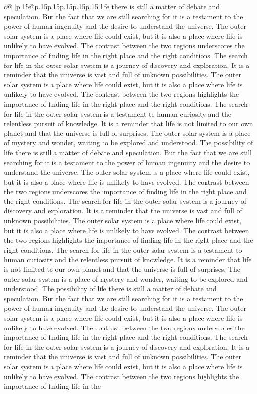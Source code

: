 \documentclass{article}
\begin{document}
{\begin{supertabular}{c@{$\;$}|p{.15\linewidth}@{}p{.15\linewidth}p{.15\linewidth}p{.15\linewidth}p{.15\linewidth}p{.15\linewidth}}
{{{life there is still a matter of debate and speculation. But the fact that we are still searching for it is a testament to the power of human ingenuity and the desire to understand the universe. The outer solar system is a place where life could exist, but it is also a place where life is unlikely to have evolved. The contrast between the two regions underscores the importance of finding life in the right place and the right conditions. The search for life in the outer solar system is a journey of discovery and exploration. It is a reminder that the universe is vast and full of unknown possibilities. The outer solar system is a place where life could exist, but it is also a place where life is unlikely to have evolved. The contrast between the two regions highlights the importance of finding life in the right place and the right conditions. The search for life in the outer solar system is a testament to human curiosity and the relentless pursuit of knowledge. It is a reminder that life is not limited to our own planet and that the universe is full of surprises. The outer solar system is a place of mystery and wonder, waiting to be explored and understood. The possibility of life there is still a matter of debate and speculation. But the fact that we are still searching for it is a testament to the power of human ingenuity and the desire to understand the universe. The outer solar system is a place where life could exist, but it is also a place where life is unlikely to have evolved. The contrast between the two regions underscores the importance of finding life in the right place and the right conditions. The search for life in the outer solar system is a journey of discovery and exploration. It is a reminder that the universe is vast and full of unknown possibilities. The outer solar system is a place where life could exist, but it is also a place where life is unlikely to have evolved. The contrast between the two regions highlights the importance of finding life in the right place and the right conditions. The search for life in the outer solar system is a testament to human curiosity and the relentless pursuit of knowledge. It is a reminder that life is not limited to our own planet and that the universe is full of surprises. The outer solar system is a place of mystery and wonder, waiting to be explored and understood. The possibility of life there is still a matter of debate and speculation. But the fact that we are still searching for it is a testament to the power of human ingenuity and the desire to understand the universe. The outer solar system is a place where life could exist, but it is also a place where life is unlikely to have evolved. The contrast between the two regions underscores the importance of finding life in the right place and the right conditions. The search for life in the outer solar system is a journey of discovery and exploration. It is a reminder that the universe is vast and full of unknown possibilities. The outer solar system is a place where life could exist, but it is also a place where life is unlikely to have evolved. The contrast between the two regions highlights the importance of finding life in the }}}
\end{supertabular}}
\end{document}
